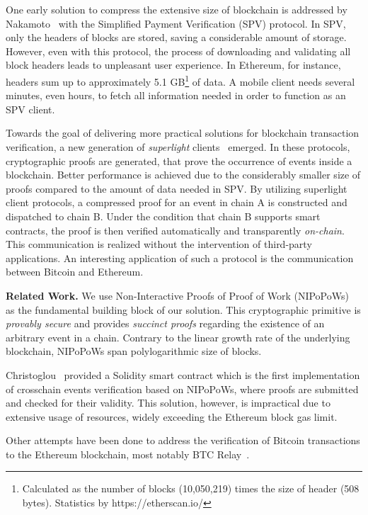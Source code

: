 One early solution to compress the extensive size of blockchain is addressed by
Nakamoto~\cite{nakamoto} with the Simplified Payment Verification (SPV)
protocol. In SPV, only the headers of blocks are stored, saving a
considerable amount of storage.  However, even with this protocol, the process
of downloading and validating all block headers leads to unpleasant user
experience. In Ethereum, for instance, headers sum up to approximately 5.1
GB\footnote{Calculated as the number of blocks (10,050,219) times the size of
header (508 bytes). Statistics by https://etherscan.io/} of data. A mobile
client needs several minutes, even hours, to fetch all information needed in
order to function as an SPV client.

Towards the goal of delivering more practical solutions for blockchain
transaction verification, a new generation of \emph{superlight}
clients~\cite{popow,nipopows,compactsuperblocks, flyclient} emerged. In these
protocols, cryptographic proofs are generated, that prove the occurrence of
events inside a blockchain. Better performance is achieved due to the
considerably smaller size of proofs compared to the amount of data needed in
SPV. By utilizing superlight client protocols, a compressed proof for an event
in chain A is constructed and dispatched to chain B. Under the condition that
chain B supports smart contracts, the proof is then verified automatically and
transparently \emph{on-chain}. This communication is realized without the
intervention of third-party applications. An interesting application of such a
protocol is the communication between Bitcoin and Ethereum.

\noindent

\textbf{Related Work.} We use Non-Interactive Proofs of Proof of Work
(NIPoPoWs)~\cite{nipopows, pow-sidechains} as the fundamental building block
of our solution. This cryptographic primitive is \emph{provably secure} and
provides \emph{succinct proofs} regarding the existence of an arbitrary event
in a chain. Contrary to the linear growth rate of the underlying blockchain,
NIPoPoWs span polylogarithmic size of blocks.

Christoglou~\cite{gglou} provided a Solidity smart contract which is the first
implementation of crosschain events verification based on NIPoPoWs, where
proofs are submitted and checked for their validity. This solution, however, is
impractical due to extensive usage of resources, widely exceeding the Ethereum
block gas limit.

Other attempts have been done to address the verification of Bitcoin
transactions to the Ethereum blockchain, most notably BTC
Relay~\cite{btcrelay}.

